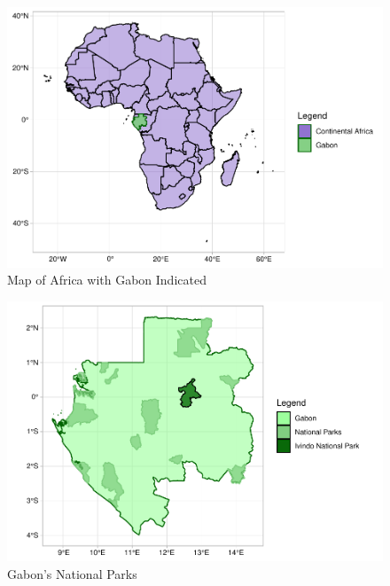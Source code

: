 \documentclass[
  12pt,
]{article}
\begin{document}
\begin{figure}
\centering
\includegraphics{GoldenGriffithsKnierMalinowski_ENV872_Project_files/figure-latex/Map of Gabon-1.pdf}
\caption{Map of Africa with Gabon Indicated}
\end{figure}

\begin{figure}
\centering
\includegraphics{GoldenGriffithsKnierMalinowski_ENV872_Project_files/figure-latex/Detailed Map of Gabon with parks-1.pdf}
\caption{Gabon's National Parks}
\end{figure}
\end{document}
